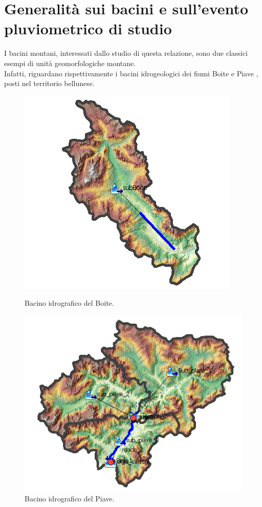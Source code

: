 \section{Generalità sui bacini e sull'evento pluviometrico di studio}
I bacini montani, interessati dallo studio di questa relazione, sono due classici esempi di unità geomorfologiche montane.\\
Infatti, riguardano rispettivamente i bacini idrogeologici dei fiumi Boite \cite{fiume_boite} e Piave \cite{fiume_piave}, posti nel territorio bellunese.
\begin{figure}[H]
    \begin{minipage}[]{7cm}
        \includegraphics[scale=0.73]{immagini/bac_boite.PNG}
        \caption{Bacino idrografico del Boite.}
    \label{bacino_boite}    
    \end{minipage}
        \hspace{2cm}
    \begin{minipage}[]{7cm}
        \includegraphics[scale=0.75]{immagini/bac_piave.PNG}
        \caption{Bacino idrografico del Piave.}
    \label{bacino_piave}
    \end{minipage} 
        \end{figure}

